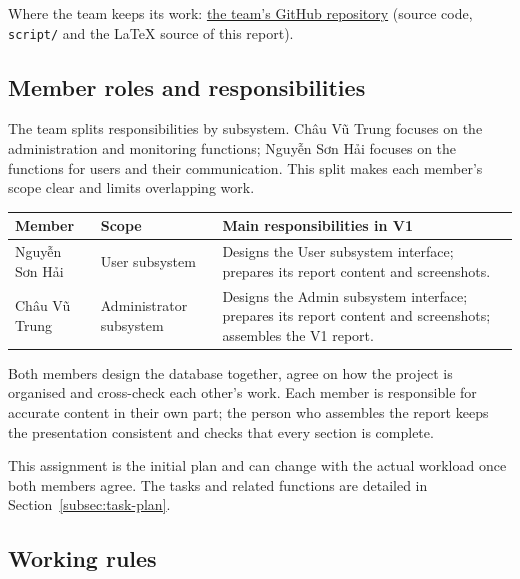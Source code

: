 \noindent Where the team keeps its work:
\href{https://github.com/nguyenshai/Project-java}{the team's GitHub repository}
(source code, \texttt{script/} and the LaTeX source of this report).

\clearpage
\subsection{Member roles and responsibilities}
\label{subsec:member-roles}

The team splits responsibilities by subsystem. Châu Vũ Trung focuses on the
administration and monitoring functions; Nguyễn Sơn Hải focuses on the functions
for users and their communication. This split makes each member's scope clear
and limits overlapping work.

\begin{center}
\small
{}
\label{tab:member-roles}
\begin{tabularx}{\textwidth}{|L{3cm}|L{2.8cm}|Y|}
  \hline
  \textbf{Member} & \textbf{Scope} &
  \textbf{Main responsibilities in V1}\\
  \hline
  Nguyễn Sơn Hải &
  User subsystem &
  Designs the User subsystem interface; prepares its report content
  and screenshots.\\
  \hline
  Châu Vũ Trung &
  Administrator subsystem &
  Designs the Admin subsystem interface; prepares its report content
  and screenshots; assembles the V1 report.\\
  \hline
\end{tabularx}
\end{center}

Both members design the database together, agree on how the project is organised
and cross-check each other's work. Each member is responsible for accurate content
in their own part; the person who assembles the report keeps the presentation
consistent and checks that every section is complete.

This assignment is the initial plan and can change with the actual workload once
both members agree. The tasks and related functions are detailed in
Section~\ref{subsec:task-plan}.

\clearpage
\subsection{Working rules}

